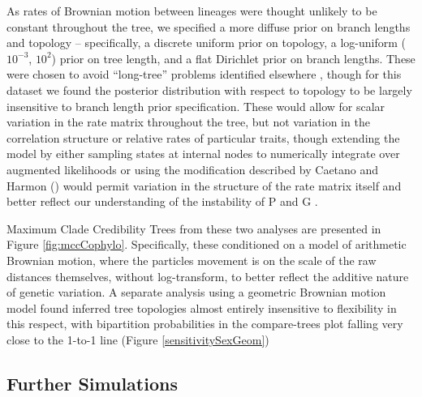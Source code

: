 \documentclass[10pt, twocolumn, twoside]{article}
\begin{document}
As rates of Brownian motion between lineages were thought unlikely to be constant throughout the tree, we specified a more diffuse prior on branch lengths and topology – specifically, a discrete uniform prior on topology, a log-uniform ($10^{-3}$, $10^2$) prior on tree length, and a flat Dirichlet prior on branch lengths. These were chosen to avoid “long-tree” problems identified elsewhere \citep{brownWhenTreesGrow2009}, though for this dataset we found the posterior distribution with respect to topology to be largely insensitive to branch length prior specification. These would allow for scalar variation in the rate matrix throughout the tree, but not variation in the correlation structure or relative rates of particular traits, though extending the model by either sampling states at internal nodes to numerically integrate over augmented likelihoods or using the modification described by Caetano and Harmon (\citeyear{caetanoEstimatingCorrelatedRates2019}) would permit variation in the structure of the rate matrix itself and better reflect our understanding of the instability of P \citep{fischerPlasticityEvolutionCorrelated2016} and G \citep{arnoldUnderstandingEvolutionStability2008}.

Maximum Clade Credibility Trees from these two analyses are presented in Figure \ref{fig:mccCophylo}. Specifically, these conditioned on a model of arithmetic Brownian motion, where the particles movement is on the scale of the raw distances themselves, without log-transform, to better reflect the additive nature of genetic variation. A separate analysis using a geometric Brownian motion model found inferred tree topologies almost entirely insensitive to flexibility in this respect, with bipartition probabilities in the compare-trees plot falling very close to the 1-to-1 line (Figure \ref{sensitivitySexGeom})

\subsection{Further Simulations}
\end{document}
